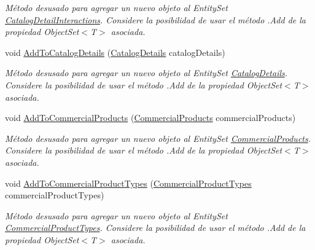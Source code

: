 \begin{DoxyCompactItemize}
\begin{DoxyCompactList}\small\item\em Método desusado para agregar un nuevo objeto al Entity\-Set \hyperlink{class_microsoft_1_1_samples_1_1_kinect_1_1_basic_interactions_1_1_catalog_detail_interactions}{Catalog\-Detail\-Interactions}. Considere la posibilidad de usar el método .Add de la propiedad Object\-Set$<$T$>$ asociada. \end{DoxyCompactList}\item 
void \hyperlink{class_microsoft_1_1_samples_1_1_kinect_1_1_basic_interactions_1_1_o_m_k_t_d_b_entities_ad85a5d2e50bf5a41cc6ffbcf1ff8cf91}{Add\-To\-Catalog\-Details} (\hyperlink{class_microsoft_1_1_samples_1_1_kinect_1_1_basic_interactions_1_1_catalog_details}{Catalog\-Details} catalog\-Details)
\begin{DoxyCompactList}\small\item\em Método desusado para agregar un nuevo objeto al Entity\-Set \hyperlink{class_microsoft_1_1_samples_1_1_kinect_1_1_basic_interactions_1_1_catalog_details}{Catalog\-Details}. Considere la posibilidad de usar el método .Add de la propiedad Object\-Set$<$T$>$ asociada. \end{DoxyCompactList}\item 
void \hyperlink{class_microsoft_1_1_samples_1_1_kinect_1_1_basic_interactions_1_1_o_m_k_t_d_b_entities_ac32357ebb3a42455fdaf543fefd2a9dd}{Add\-To\-Commercial\-Products} (\hyperlink{class_microsoft_1_1_samples_1_1_kinect_1_1_basic_interactions_1_1_commercial_products}{Commercial\-Products} commercial\-Products)
\begin{DoxyCompactList}\small\item\em Método desusado para agregar un nuevo objeto al Entity\-Set \hyperlink{class_microsoft_1_1_samples_1_1_kinect_1_1_basic_interactions_1_1_commercial_products}{Commercial\-Products}. Considere la posibilidad de usar el método .Add de la propiedad Object\-Set$<$T$>$ asociada. \end{DoxyCompactList}\item 
void \hyperlink{class_microsoft_1_1_samples_1_1_kinect_1_1_basic_interactions_1_1_o_m_k_t_d_b_entities_a1eb6aa01ae1560ba3e164ef3a0d59da6}{Add\-To\-Commercial\-Product\-Types} (\hyperlink{class_microsoft_1_1_samples_1_1_kinect_1_1_basic_interactions_1_1_commercial_product_types}{Commercial\-Product\-Types} commercial\-Product\-Types)
\begin{DoxyCompactList}\small\item\em Método desusado para agregar un nuevo objeto al Entity\-Set \hyperlink{class_microsoft_1_1_samples_1_1_kinect_1_1_basic_interactions_1_1_commercial_product_types}{Commercial\-Product\-Types}. Considere la posibilidad de usar el método .Add de la propiedad Object\-Set$<$T$>$ asociada. \end{DoxyCompactList}\item 

\end{DoxyCompactItemize}
